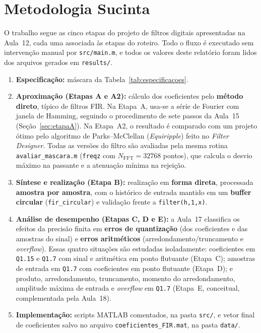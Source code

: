 \documentclass[11pt,a4paper]{article}
\begin{document}
\section{Metodologia Sucinta}

O trabalho segue as cinco etapas do projeto de filtros digitais apresentadas na Aula~12, cada uma associada às etapas do roteiro. Todo o fluxo é executado sem intervenção manual por \texttt{src/main.m}, e todos os valores deste relatório foram lidos dos arquivos gerados em \texttt{results/}.

\begin{enumerate}[leftmargin=1.6em, itemsep=2pt, topsep=3pt]
    \item \textbf{Especificação:} máscara da Tabela~\ref{tab:especificacoes}.

    \item \textbf{Aproximação (Etapas A e A2):} cálculo dos coeficientes pelo \textbf{método direto}, típico de filtros FIR. Na Etapa~A, usa-se a série de Fourier com janela de Hamming, seguindo o procedimento de sete passos da Aula~15 (Seção~\ref{sec:etapaA}). Na Etapa~A2, o resultado é comparado com um projeto ótimo pelo algoritmo de Parks--McClellan (\textit{Equiripple}) feito no \textit{Filter Designer}. Todas as versões do filtro são avaliadas pela mesma rotina \texttt{avaliar\_mascara.m} (\texttt{freqz} com $N_{\text{FFT}} = \num{32768}$ pontos), que calcula o desvio máximo na passante e a atenuação mínima na rejeição.

    \item \textbf{Síntese e realização (Etapa B):} realização em \textbf{forma direta}, processada \textbf{amostra por amostra}, com o histórico de entrada mantido em um \textbf{buffer circular} (\texttt{fir\_circular}) e validação frente a \texttt{filter(h,1,x)}.

    \item \textbf{Análise de desempenho (Etapas C, D e E):} a Aula~17 classifica os efeitos da precisão finita em \textbf{erros de quantização} (dos coeficientes e das amostras do sinal) e \textbf{erros aritméticos} (arredondamento/truncamento e \textit{overflow}). Essas quatro situações são estudadas isoladamente: coeficientes em \texttt{Q1.15} e \texttt{Q1.7} com sinal e aritmética em ponto flutuante (Etapa~C); amostras de entrada em \texttt{Q1.7} com coeficientes em ponto flutuante (Etapa~D); e produto, arredondamento, truncamento, momento do arredondamento, amplitude máxima de entrada e \textit{overflow} em \texttt{Q1.7} (Etapa~E, conceitual, complementada pela Aula~18).

    \item \textbf{Implementação:} scripts MATLAB comentados, na pasta \texttt{src/}, e vetor final de coeficientes salvo no arquivo \texttt{coeficientes\_FIR.mat}, na pasta \texttt{data/}.
\end{enumerate}
\end{document}
